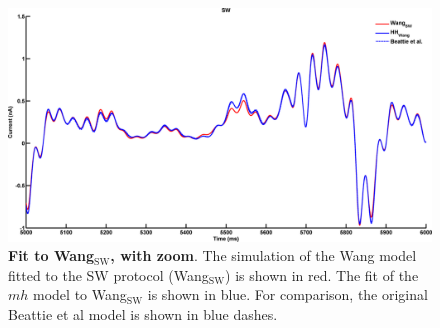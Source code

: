 \documentclass[11pt,a4paper,oneside]{article}
\begin{document}
\begin{figure}[hb]
\begin{center}
\includegraphics[scale=0.42]{Figures/Fig_mh_16713110_FP_sine_wave_wang_CP_sine_wave_wang_zoom.png}
\caption{\textbf{Fit to Wang$_\text{SW}$, with zoom}. The simulation of the Wang model fitted to the SW protocol (Wang$_\text{SW}$) is shown in red. The fit of the $mh$ model to Wang$_\text{SW}$ is shown in blue. For comparison, the original Beattie et al model is shown in blue dashes. } 
\label{Fig_SW_Wang_Zoom}
\end{center}
\end{figure}

\begin{table}
\caption{Fitted HH model parameters to the Wang model}
\centering
{}
\label{Tab_Fitted_Parameters_Wang}
\end{table}
\end{document}
